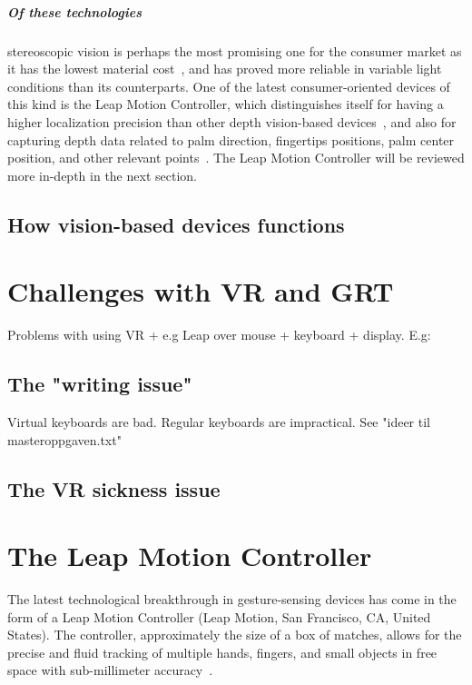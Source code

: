 \documentclass[UKenglish]{ifimaster}
\begin{document}
\paragraph{Of these technologies} stereoscopic vision is perhaps the most promising one for the consumer market as it has the lowest material cost~\citep{Ko2012}, and has proved more reliable in variable light conditions than its counterparts. One of the latest consumer-oriented devices of this kind is the Leap Motion Controller, which distinguishes itself for having a higher localization precision than other depth vision-based devices~\citep{Weichert2013}, and also for capturing depth data related to palm direction, fingertips positions, palm center position, and other relevant points~\citep{Wei2016}. The Leap Motion Controller will be reviewed more in-depth in the next section. 


\section{How vision-based devices functions}

\chapter{Challenges with VR and GRT} 
Problems with using VR + e.g Leap over mouse + keyboard + display. E.g:

\section{The "writing issue"}
Virtual keyboards are bad. 
Regular keyboards are impractical. 
See "ideer til masteroppgaven.txt"

\section{The VR sickness issue}


\chapter{The Leap Motion Controller}
The latest technological breakthrough in gesture-sensing devices has come in the form of a Leap Motion Controller (Leap Motion, San Francisco, CA, United States). The controller, approximately the size of a box of matches, allows for the precise and fluid tracking of multiple hands, fingers, and small objects in free space with sub-millimeter accuracy~\citep{Guna2014}.
\end{document}
